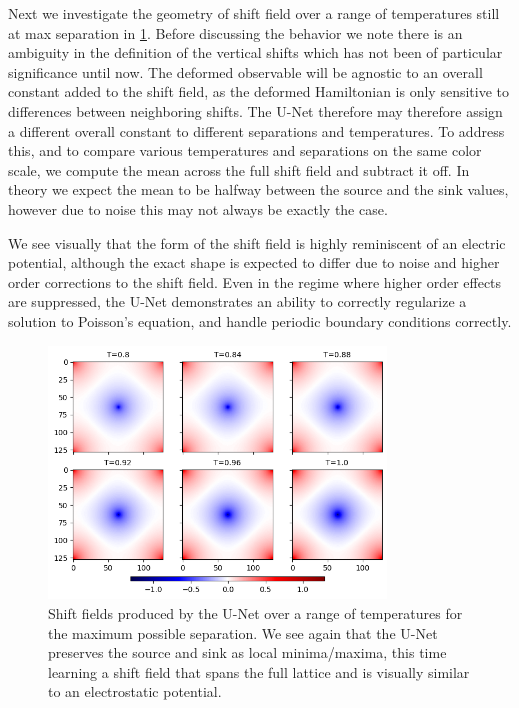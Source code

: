\documentclass[12pt]{article}
\begin{document}
Next we investigate the geometry of shift field over a range of temperatures still at max separation in \ref{fig:unet_max_shifts}. Before discussing the behavior we note 
there is an ambiguity in the definition of the vertical shifts which has not been of particular significance until now. The deformed observable will be agnostic to 
an overall constant added to the shift field, as the deformed Hamiltonian is only sensitive to differences between neighboring shifts. The U-Net therefore may therefore 
assign a different overall constant to different separations and temperatures. To address this, and to compare various temperatures and separations on the same color scale, 
we compute the mean across the full shift field and subtract it off. In theory we expect the mean to be halfway between the source and the sink values, however due to
noise this may not always be exactly the case.

We see visually that the form of the shift field is highly reminiscent of an electric potential, although the exact shape is expected to differ due to noise and higher
order corrections to the shift field. Even in the regime where higher order effects are suppressed, the U-Net demonstrates an ability to
correctly regularize a solution to Poisson's equation, and handle periodic boundary conditions correctly.

\begin{figure}
	\centering
	\includegraphics[width=0.8\textwidth]{figures/unet_max_shifts.png}
	\caption[U-Net Max Shifts]{Shift fields produced by the U-Net over a range of temperatures for the maximum possible separation. We see again
	that the U-Net preserves the source and sink as local minima/maxima, this time learning a shift field that spans the full lattice and is
	visually similar to an electrostatic potential.}
	\label{fig:unet_max_shifts}
\end{figure}
\end{document}
